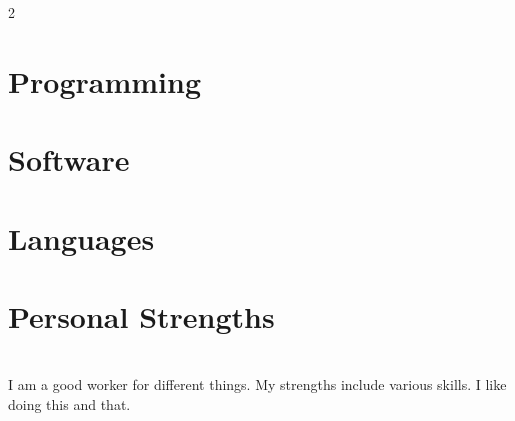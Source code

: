\documentclass[DIV=18]{medercv2025}
\author{John Doe}
\begin{document}
\setmetadata

\color{normal}

\maketitle

\begin{paracol}{2}

\section*{\thecontactname}
\contactinfo


\section*{Programming}
\begin{skills}
\end{skills}

\section*{Software}
\begin{skills}
\skilldescribed{\LaTeX{}}{}
\end{skills}

\section*{Languages}
\begin{skills}
\end{skills}

\section*{Personal Strengths}
\begin{skills}
\end{skills}

\switchcolumn

\section*{\theaboutmename}
I am a good worker for different things. My strengths include various skills. I like doing this and that.


\end{paracol}
\end{document}
